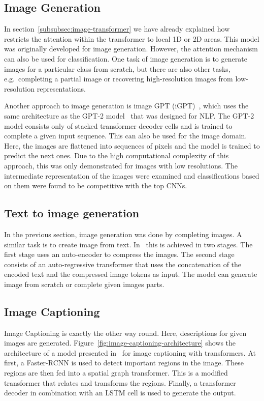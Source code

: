 \documentclass[a4paper]{scrartcl}
\begin{document}
    \subsection{Image Generation}\label{subsec:image-generation}
    In section~\ref{subsubsec:image-transformer} we have already explained how~\cite{parmar2018image} restricts the attention within the transformer to local 1D or 2D areas.
    This model was originally developed for image generation.
    However, the attention mechanism can also be used for classification.
    One task of image generation is to generate images for a particular class from scratch, but there are also other tasks, e.g.\ completing a partial image or recovering high-resolution images from low-resolution representations.

    Another approach to image generation is image GPT (iGPT)~\cite{chen2020generative}, which uses the same architecture as the GPT-2 model~\cite{radford2019language} that was designed for NLP\@.
    The GPT-2 model consists only of stacked transformer decoder cells and is trained to complete a given input sequence.
    This can also be used for the image domain.
    Here, the images are flattened into sequences of pixels and the model is trained to predict the next ones.
    Due to the high computational complexity of this approach, this was only demonstrated for images with low resolutions.
    The intermediate representation of the images were examined and classifications based on them were found to be competitive with the top CNNs.

    \subsection{Text to image generation}\label{subsec:text-to-image-generation}
    In the previous section, image generation was done by completing images.
    A similar task is to create image from text.
    In~\cite{ramesh2021zeroshot} this is achieved in two stages.
    The first stage uses an auto-encoder to compress the images.
    The second stage consists of an auto-regressive transformer that uses the concatenation of the encoded text and the compressed image tokens as input.
    The model can generate image from scratch or complete given images parts.

    \subsection{Image Captioning}\label{subsec:image-captioning}
    Image Captioning is exactly the other way round.
    Here, descriptions for given images are generated.
    Figure~\ref{fig:image-captioning-architecture} shows the architecture of a model presented in~\cite{he2021image} for image captioning with transformers.
    At first, a Faster-RCNN is used to detect important regions in the image.
    These regions are then fed into a spatial graph transformer.
    This is a modified transformer that relates and transforms the regions.
    Finally, a transformer decoder in combination with an LSTM cell is used to generate the output.
\end{document}
